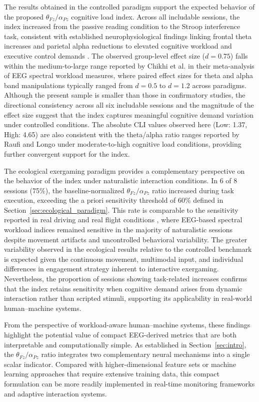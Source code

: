 \documentclass[10pt]{iopart}
\begin{document}
The results obtained in the controlled paradigm support the
expected behavior of the proposed $\theta_{Fz}/\alpha_{Pz}$
cognitive load index. Across all includable sessions, the index
increased from the passive reading condition to the Stroop
interference task, consistent with established neurophysiological
findings linking frontal theta increases and parietal alpha
reductions to elevated cognitive workload and executive control
demands \cite{c1,c4,c5,c9}. The observed group-level effect size
($d = 0.75$) falls within the medium-to-large range reported by
Chikhi et al. \cite{c4} in their meta-analysis of EEG spectral
workload measures, where paired effect sizes for theta and alpha
band manipulations typically ranged from $d = 0.5$ to $d = 1.2$
across paradigms. Although the present sample is smaller than
those in confirmatory studies, the directional consistency across
all six includable sessions and the magnitude of the effect size
suggest that the index captures meaningful cognitive demand
variation under controlled conditions. The absolute CLI values
observed here (Low: 1.37, High: 4.65) are also consistent with
the theta/alpha ratio ranges reported by Raufi and Longo
\cite{c1} under moderate-to-high cognitive load conditions,
providing further convergent support for the index.

The ecological exergaming paradigm provides a complementary
perspective on the behavior of the index under naturalistic
interaction conditions. In 6 of 8 sessions (75\%), the
baseline-normalized $\theta_{Fz}/\alpha_{Pz}$ ratio increased
during task execution, exceeding the a priori sensitivity
threshold of 60\% defined in
Section~\ref{sec:ecological_paradigm}. This rate is comparable
to the sensitivity reported in real driving \cite{DiFlumeri2018_RealDrivingMWL}
and real flight conditions \cite{Dehais2019_RealFlightDryEEG},
where EEG-based spectral workload indices remained sensitive in
the majority of naturalistic sessions despite movement artifacts
and uncontrolled behavioral variability. The greater variability
observed in the ecological results relative to the controlled
benchmark is expected given the continuous movement, multimodal
input, and individual differences in engagement strategy inherent
to interactive exergaming. Nevertheless, the proportion of
sessions showing task-related increases confirms that the index
retains sensitivity when cognitive demand arises from dynamic
interaction rather than scripted stimuli, supporting its
applicability in real-world human--machine systems.

From the perspective of workload-aware human--machine systems, these findings highlight the potential value of compact EEG-derived metrics that are both interpretable and computationally simple. As established in Section~\ref{sec:intro}, the $\theta_{Fz}/\alpha_{Pz}$ ratio integrates two complementary neural mechanisms into a single scalar indicator. Compared with higher-dimensional feature sets or machine learning approaches that require extensive training data, this compact formulation can be more readily implemented in real-time monitoring frameworks and adaptive interaction systems.
\end{document}
